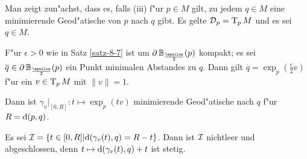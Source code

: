 \begin{bew}
  Man zeigt zun"achst, dass es, falls (iii) f"ur $p \in M$ gilt, zu jedem  $q \in M$ eine minimierende Geod"atische von $p$ nach $q$ gibt.
  Es gelte $\operatorname{\mathcal{D}}_p = \operatorname{T}_pM$ und es sei $q \in M$.
  \begin{center}\end{center}
  F"ur $\epsilon > 0$ wie in Satz \ref{satz-8-7} ist um $\partial \B_{\frac{\epsilon}{2}}(p)$ kompakt; es sei $\overline q \in \partial \B_{\frac{\epsilon}{2}}(p)$ ein Punkt minimalen Abstandes zu $q$.
  Dann gilt $\overline q = \exp_p(\frac{\epsilon}{2}v)$ f"ur ein $v \in \operatorname{T}_pM$ mit $\|v\| = 1$.
  \begin{description}[font=\normalfont\itshape]
  \item[Behauptung:] Dann ist $\gamma_v|_{[0,R]}: t \mapsto \exp_p(tv)$ minimierende Geod"atische nach $q$ f"ur $R = \mathrm{d}(p,q)$.
  \end{description}
  Es sei $\operatorname{\mathcal{I}} = \{t \in [0,R] | \mathrm{d}(\gamma_v(t),q) = R - t\}$. Dann ist $\operatorname{\mathcal{I}}$ nichtleer und abgeschlossen, denn $t \mapsto \mathrm{d}(\gamma_v(t),q) + t$ ist stetig.
  \begin{center}
\end{center}
\end{bew}

